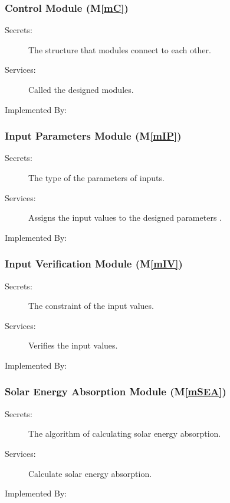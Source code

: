 \documentclass[12pt, titlepage]{article}
\newcommand{\mref}[1]{M\ref{#1}}
\begin{document}
\subsubsection{Control Module (\mref{mC}) }

\begin{description}
\item[Secrets:] The structure that modules connect to each other.
\item[Services:] Called the designed modules.
\item[Implemented By:] \progname
\end{description}

\subsubsection{Input Parameters Module (\mref{mIP})}

\begin{description}
\item[Secrets:] The type of the parameters  of inputs.
\item[Services:] Assigns the input values to the designed parameters .

\item[Implemented By:] \progname
\end{description}


\subsubsection{Input Verification Module (\mref{mIV})}

\begin{description}
\item[Secrets:] The constraint of the input values.
\item[Services:] Verifies  the input values.
\item[Implemented By:] \progname
\end{description}


\subsubsection{Solar Energy Absorption Module (\mref{mSEA})}

\begin{description}
\item[Secrets:]The algorithm of calculating solar energy absorption.
\item[Services:] Calculate solar energy absorption.

\item[Implemented By:] \progname
\end{description}
\end{document}
